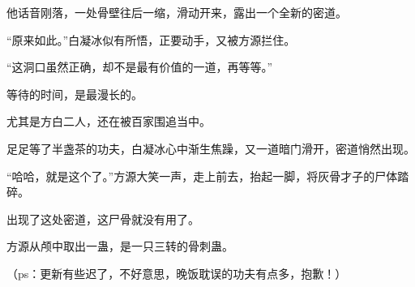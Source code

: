 \begin{this_body}
他话音刚落，一处骨壁往后一缩，滑动开来，露出一个全新的密道。

“原来如此。”白凝冰似有所悟，正要动手，又被方源拦住。

“这洞口虽然正确，却不是最有价值的一道，再等等。”

等待的时间，是最漫长的。

尤其是方白二人，还在被百家围追当中。

足足等了半盏茶的功夫，白凝冰心中渐生焦躁，又一道暗门滑开，密道悄然出现。

“哈哈，就是这个了。”方源大笑一声，走上前去，抬起一脚，将灰骨才子的尸体踏碎。

出现了这处密道，这尸骨就没有用了。

方源从颅中取出一蛊，是一只三转的骨刺蛊。

（ps：更新有些迟了，不好意思，晚饭耽误的功夫有点多，抱歉！）

\end{this_body}

